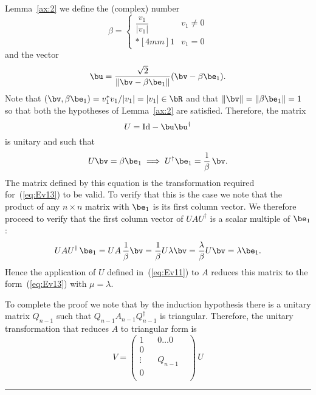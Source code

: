 Lemma~\ref{ax:2} we define the (complex) number
%
\begin{equation*}
  \beta =
  \begin{cases}
    \dfrac{v_1}{|v_1|} & v_1 \neq 0 \\*[4mm] 1 & v_1 = 0
  \end{cases}
\end{equation*}
%
and the vector 
%
\begin{equation*}
  \bu = \frac{\sqrt{2}}{\|\bv - \beta \be_1\|} (\bv - \beta \be_1) .
\end{equation*}
%
Note that $(\bv, \beta \be_1) = v_1^{*} v_1/|v_1|=|v_1| \in \bR$ and
that $\|\bv\| = \|\beta \be_1\| = 1$ so that both the hypotheses of
Lemma~\ref{ax:2} are satisfied.  Therefore, the matrix
%
\begin{equation}
  U = \text{Id} - \bu \bu^{\dagger}
  \label{eq:Ev11}
\end{equation}
%
is unitary and such that 
%
\begin{equation}
  U \bv = \beta \be_1 \implies U^{\dagger} \be_1 = \frac{1}{\beta} \, \bv .
  \label{eq:Ev12}
\end{equation}
%
The matrix defined by this equation is the transformation required
for~(\ref{eq:Ev13}) to be valid.  To verify that this is the case we
note that the product of any $n \times n$ matrix with $\be_1$ is its
first column vector.  We therefore proceed to verify that the first
column vector of $U A U^{\dagger}$ is a scalar multiple of $\be_1$:
%
\begin{equation*}
  U A U^{\dagger} \, \be_1 = U A \, \frac{1}{\beta} \bv =
  \frac{1}{\beta} U \lambda \bv = \frac{\lambda}{\beta} U \bv = 
  \lambda \be_1 .
\end{equation*}
%
Hence the application of $U$ defined in~(\ref{eq:Ev11}) to $A$ reduces
this matrix to the form~(\ref{eq:Ev13}) with $\mu = \lambda$.

To complete the proof we note that by the induction hypothesis there
is a unitary matrix $Q_{n-1}$ such that $Q_{n-1} A_{n-1}
Q^{\dagger}_{n-1}$ is triangular.  Therefore, the unitary
transformation that reduces $A$ to triangular form is
%
\begin{equation*}
  V = 
  \left ( \begin{array}{c|ccc}
      1 & & 0 \ldots 0 & \\ \hline
      0 & & & \\
      \vdots & & Q_{n-1} & \\
      0 & & & \\ 
    \end{array} \right ) \, U 
\end{equation*}
\null \hfill \rule{3mm}{3mm}

